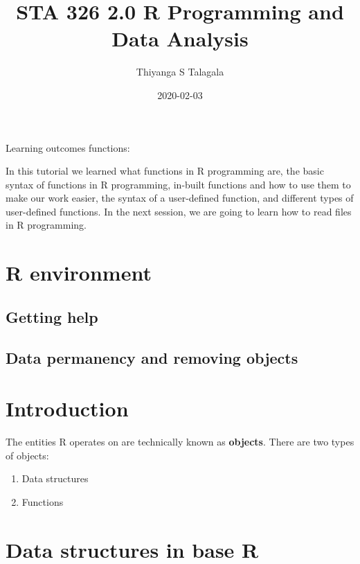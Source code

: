 \documentclass[
]{book}
\title{STA 326 2.0 R Programming and Data Analysis}
\author{Thiyanga S Talagala}
\date{2020-02-03}
\begin{document}
\maketitle

{
\setcounter{tocdepth}{1}
\tableofcontents
}
Learning outcomes functions:

In this tutorial we learned what functions in R programming are, the basic syntax of functions in R programming, in-built functions and how to use them to make our work easier, the syntax of a user-defined function, and different types of user-defined functions. In the next session, we are going to learn how to read files in R programming.

\hypertarget{elements}{%
\chapter{R environment}\label{elements}}

\hypertarget{getting-help}{%
\section{Getting help}\label{getting-help}}

\hypertarget{data-permanency-and-removing-objects}{%
\section{Data permanency and removing objects}\label{data-permanency-and-removing-objects}}

\hypertarget{intro}{%
\chapter{Introduction}\label{intro}}

The entities R operates on are technically known as \textbf{objects}. There are two types of objects:

\begin{enumerate}
\def\labelenumi{\arabic{enumi}.}
\item
  Data structures
\item
  Functions
\end{enumerate}

\hypertarget{data-structures-in-base-r}{%
\chapter{Data structures in base R}\label{data-structures-in-base-r}}
\end{document}
